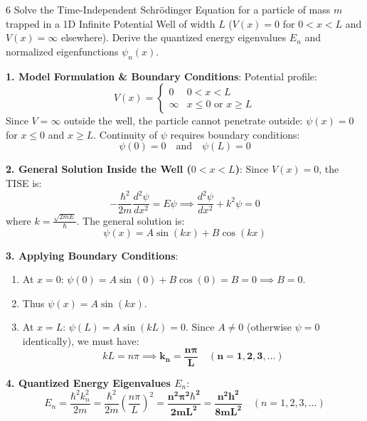 \begin{theoryq}{6}
Solve the Time-Independent Schrödinger Equation for a particle of mass $m$ trapped in a 1D Infinite Potential Well of width $L$ ($V(x) = 0$ for $0 < x < L$ and $V(x) = \infty$ elsewhere). Derive the quantized energy eigenvalues $E_n$ and normalized eigenfunctions $\psi_n(x)$.
\end{theoryq}
\begin{theorysol}
\textbf{1. Model Formulation \& Boundary Conditions}:
Potential profile:
\begin{equation}
V(x) = \begin{cases} 0 & 0 < x < L \\ \infty & x \le 0 \text{ or } x \ge L \end{cases}
\end{equation}
Since $V = \infty$ outside the well, the particle cannot penetrate outside: $\psi(x) = 0$ for $x \le 0$ and $x \ge L$.
Continuity of $\psi$ requires boundary conditions:
\begin{equation}
\psi(0) = 0 \quad \text{and} \quad \psi(L) = 0
\end{equation}

\textbf{2. General Solution Inside the Well ($0 < x < L$)}:
Since $V(x) = 0$, the TISE is:
\begin{equation}
-\frac{\hbar^2}{2m}\frac{d^2\psi}{dx^2} = E\psi \implies \frac{d^2\psi}{dx^2} + k^2\psi = 0
\end{equation}
where $k = \frac{\sqrt{2mE}}{\hbar}$.
The general solution is:
\begin{equation}
\psi(x) = A\sin(kx) + B\cos(kx)
\end{equation}

\textbf{3. Applying Boundary Conditions}:
\begin{enumerate}
    \item At $x = 0$: $\psi(0) = A\sin(0) + B\cos(0) = B = 0 \implies B = 0$.
    \item Thus $\psi(x) = A\sin(kx)$.
    \item At $x = L$: $\psi(L) = A\sin(kL) = 0$.
    Since $A \ne 0$ (otherwise $\psi=0$ identically), we must have:
    \begin{equation}
    k L = n\pi \implies \mathbf{k_n = \frac{n\pi}{L} \quad (n = 1, 2, 3,\dots)}
    \end{equation}
\end{enumerate}

\textbf{4. Quantized Energy Eigenvalues $E_n$}:
\begin{equation}
E_n = \frac{\hbar^2 k_n^2}{2m} = \frac{\hbar^2}{2m}\left(\frac{n\pi}{L}\right)^2 = \mathbf{\frac{n^2 \pi^2 \hbar^2}{2m L^2} = \frac{n^2 h^2}{8m L^2}} \quad (n = 1, 2, 3,\dots)
\end{equation}


\end{theorysol}
